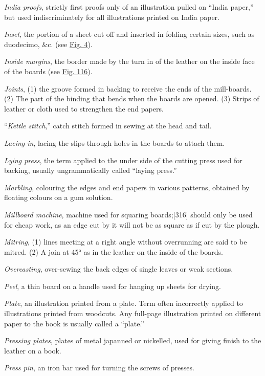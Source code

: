 \documentclass[
]{article}
\begin{document}
\emph{India proofs}, strictly first proofs only of an illustration
pulled on ``India paper,'' but used indiscriminately for all
illustrations printed on India paper.

\emph{Inset}, the portion of a sheet cut off and inserted in folding
certain sizes, such as duodecimo, \&c. (see
\protect\hyperlink{Fig_4}{Fig. 4}).

\emph{Inside margins}, the border made by the turn in of the leather on
the inside face of the boards (see \protect\hyperlink{Fig_116}{Fig.
116}).

\emph{Joints}, (1) the groove formed in backing to receive the ends of
the mill-boards. (2) The part of the binding that bends when the boards
are opened. (3) Strips of leather or cloth used to strengthen the end
papers.

``\emph{Kettle stitch},'' catch stitch formed in sewing at the head and
tail.

\emph{Lacing in}, lacing the slips through holes in the boards to attach
them.

\emph{Lying press}, the term applied to the under side of the cutting
press used for backing, usually ungrammatically called ``laying press.''

\emph{Marbling}, colouring the edges and end papers in various patterns,
obtained by floating colours on a gum solution.

\emph{Millboard machine}, machine used for squaring
boards;{\protect\hypertarget{Page_316}{}{{[}316{]}}} should only be used
for cheap work, as an edge cut by it will not be as square as if cut by
the plough.

\emph{Mitring}, (1) lines meeting at a right angle without overrunning
are said to be mitred. (2) A join at 45° as in the leather on the inside
of the boards.

\emph{Overcasting}, over-sewing the back edges of single leaves or weak
sections.

\emph{Peel}, a thin board on a handle used for hanging up sheets for
drying.

\emph{Plate}, an illustration printed from a plate. Term often
incorrectly applied to illustrations printed from woodcuts. Any
full-page illustration printed on different paper to the book is usually
called a ``plate.''

\emph{Pressing plates}, plates of metal japanned or nickelled, used for
giving finish to the leather on a book.

\emph{Press pin}, an iron bar used for turning the screws of presses.
\end{document}
